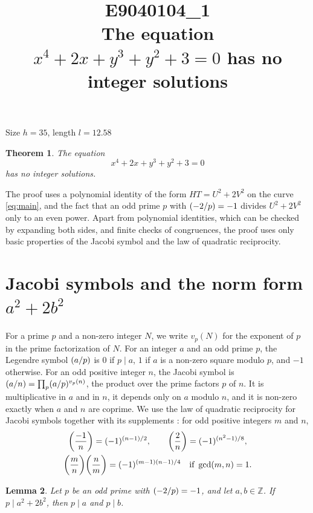 \documentclass[11pt]{article}
\title{\textbf{E9040104\_1}\\[4pt] {\Large The equation $x^{4}+2x+y^{3}+y^{2}+3=0$ has no integer solutions}}
\author{}
\date{}
\newtheorem{theorem}{Theorem}
\newtheorem{lemma}[theorem]{Lemma}
\newcommand{\Z}{\mathbb{Z}}
\newcommand{\leg}[2]{\mathchoice{\biggl(\dfrac{#1}{#2}\biggr)}{(#1/#2)}{(#1/#2)}{(#1/#2)}}
\begin{document}
\maketitle
\vspace{-8ex}
\begin{center}
Size $h=35$, length $l=12.58$
\end{center}

\begin{theorem}\label{thm:main}
The equation
\begin{equation}\label{eq:main}
x^{4}+2x+y^{3}+y^{2}+3=0
\end{equation}
has no integer solutions.
\end{theorem}

The proof uses a polynomial identity of the form $HT=U^2+2V^2$ on the curve \eqref{eq:main}, and the fact that an odd prime $p$ with $\leg{-2}{p}=-1$ divides $U^2+2V^2$ only to an even power. Apart from polynomial identities, which can be checked by expanding both sides, and finite checks of congruences, the proof uses only basic properties of the Jacobi symbol and the law of quadratic reciprocity.

\section{\texorpdfstring{Jacobi symbols and the norm form $a^2+2b^2$}{Jacobi symbols and the norm form}}

For a prime $p$ and a non-zero integer $N$, we write $v_p(N)$ for the exponent of $p$ in the prime factorization of $N$. For an integer $a$ and an odd prime $p$, the Legendre symbol $\leg{a}{p}$ is $0$ if $p\mid a$, $1$ if $a$ is a non-zero square modulo $p$, and $-1$ otherwise. For an odd positive integer $n$, the Jacobi symbol is $\leg{a}{n}=\prod_p\leg{a}{p}^{v_p(n)}$, the product over the prime factors $p$ of $n$. It is multiplicative in $a$ and in $n$, it depends only on $a$ modulo $n$, and it is non-zero exactly when $a$ and $n$ are coprime. We use the law of quadratic reciprocity for Jacobi symbols together with its supplements \cite[Chapter~5, \S2]{IR}: for odd positive integers $m$ and $n$,
\begin{gather*}
\leg{-1}{n}=(-1)^{(n-1)/2},\qquad\leg{2}{n}=(-1)^{(n^2-1)/8},\\
\leg{m}{n}\leg{n}{m}=(-1)^{(m-1)(n-1)/4}\quad\text{if }\gcd(m,n)=1.
\end{gather*}

\begin{lemma}\label{lem:divides}
Let $p$ be an odd prime with $\leg{-2}{p}=-1$, and let $a,b\in\Z$. If $p\mid a^2+2b^2$, then $p\mid a$ and $p\mid b$.
\end{lemma}
\end{document}
